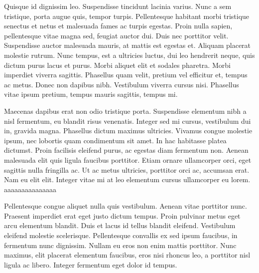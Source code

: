Quisque id dignissim leo. Suspendisse tincidunt lacinia varius. Nunc a sem tristique, porta augue quis, tempor turpis. Pellentesque habitant morbi tristique senectus et netus et malesuada fames ac turpis egestas. Proin nulla sapien, pellentesque vitae magna sed, feugiat auctor dui. Duis nec porttitor velit. Suspendisse auctor malesuada mauris, at mattis est egestas et. Aliquam placerat molestie rutrum. Nunc tempus, est a ultricies luctus, dui leo hendrerit neque, quis dictum purus lacus et purus. Morbi aliquet elit et sodales pharetra. Morbi imperdiet viverra sagittis. Phasellus quam velit, pretium vel efficitur et, tempus ac metus. Donec non dapibus nibh. Vestibulum viverra cursus nisi. Phasellus vitae ipsum pretium, tempus mauris sagittis, tempus mi.

Maecenas dapibus erat non odio tristique porta. Suspendisse elementum nibh a nisl fermentum, eu blandit risus venenatis. Integer sed mi cursus, vestibulum dui in, gravida magna. Phasellus dictum maximus ultricies. Vivamus congue molestie ipsum, nec lobortis quam condimentum sit amet. In hac habitasse platea dictumst. Proin facilisis eleifend purus, ac egestas diam fermentum non. Aenean malesuada elit quis ligula faucibus porttitor. Etiam ornare ullamcorper orci, eget sagittis nulla fringilla ac. Ut ac metus ultricies, porttitor orci ac, accumsan erat. Nam eu elit elit. Integer vitae mi at leo elementum cursus ullamcorper eu lorem. aaaaaaaaaaaaaaa

Pellentesque congue aliquet nulla quis vestibulum. Aenean vitae porttitor nunc. Praesent imperdiet erat eget justo dictum tempus. Proin pulvinar metus eget arcu elementum blandit. Duis et lacus id tellus blandit eleifend. Vestibulum eleifend molestie scelerisque. Pellentesque convallis ex sed ipsum faucibus, in fermentum nunc dignissim. Nullam eu eros non enim mattis porttitor. Nunc maximus, elit placerat elementum faucibus, eros nisi rhoncus leo, a porttitor nisl ligula ac libero. Integer fermentum eget dolor id tempus.

